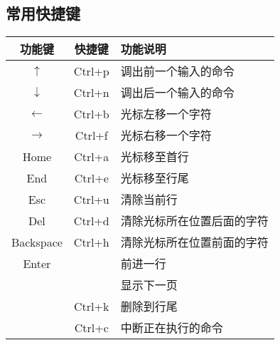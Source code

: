     \subsection{常用快捷键 }
        \begin{table}[H]
        \centering
          \begin{tabular}{ccl}%
            \toprule
            功能键&快捷键& 功能说明\\
            \midrule
            $\uparrow$ & Ctrl+p &调出前一个输入的命令\\
            $\downarrow$ & Ctrl+n&调出后一个输入的命令\\
            $\leftarrow$ & Ctrl+b&光标左移一个字符\\
            $\rightarrow$ & Ctrl+f& 光标右移一个字符\\
            Home &Ctrl+a & 光标移至首行\\
            End& Ctrl+e&光标移至行尾\\
            Esc & Ctrl+u&清除当前行\\
            Del & Ctrl+d&清除光标所在位置后面的字符\\
            Backspace & Ctrl+h & 清除光标所在位置前面的字符\\
            Enter & {} & 前进一行\\
            {} & {} & 显示下一页\\
            {}&Ctrl+k&删除到行尾\\
            {}&Ctrl+c&中断正在执行的命令\\
            \bottomrule
        \end{tabular}
        \end{table}
